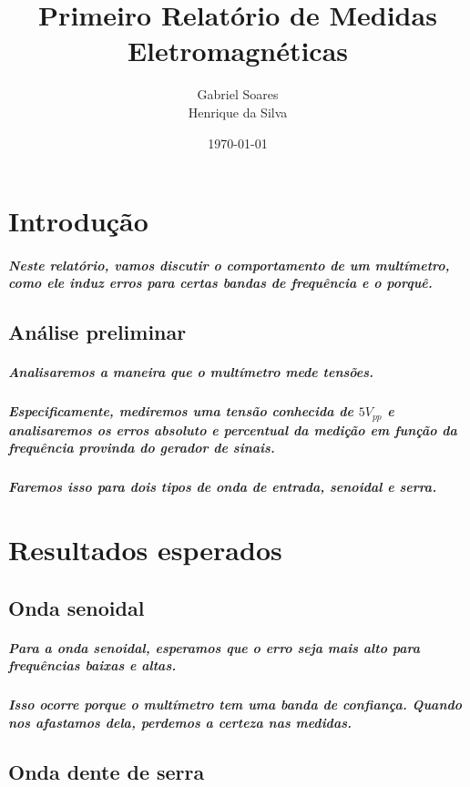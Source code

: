\documentclass[12pt,twoside, a4paper, twocolumn]{article}
\title{Primeiro Relatório de Medidas Eletromagnéticas}
\author{Gabriel Soares \\ Henrique da Silva}
\date{\today}
\begin{document}
\maketitle
{}
\newpage
\tableofcontents
\newpage



\section{Introdução}


\subparagraph*{Neste relatório, vamos discutir o comportamento de um multímetro, como ele induz erros para certas bandas de frequência e o porquê.}





\subsection{Análise preliminar}

\subparagraph*{Analisaremos a maneira que o multímetro mede tensões.}

\subparagraph*{Especificamente, mediremos uma tensão conhecida de $5 V_{pp}$ e analisaremos os erros absoluto e percentual da medição em função da frequência provinda do gerador de sinais.}

\subparagraph*{Faremos isso para dois tipos de onda de entrada, senoidal e serra.}

\section{Resultados esperados}

\subsection{Onda senoidal}

\subparagraph*{Para a onda senoidal, esperamos que o erro seja mais alto para frequências baixas e altas.}

\subparagraph*{Isso ocorre porque o multímetro tem uma banda de confiança. Quando nos afastamos dela, perdemos a certeza nas medidas.}

\subsection{Onda dente de serra}
\end{document}
